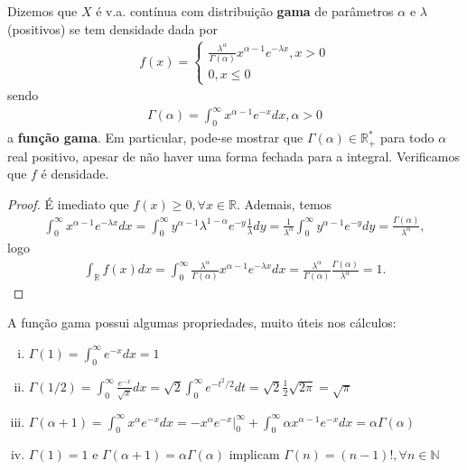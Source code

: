 \documentclass[../Notas.tex]{subfiles}
\begin{document}
\begin{example}
Dizemos que $X$ é v.a. contínua com distribuição \textbf{gama} de parâmetros $\alpha$ e $\lambda$ (positivos) se tem densidade dada por
\begin{align*}
    f(x) = \begin{cases}
    \frac{\lambda^{\alpha}}{\Gamma(\alpha)}x^{\alpha - 1}e^{-\lambda x}, x > 0 \\
    0, x\leq 0
    \end{cases}
\end{align*}
sendo
\begin{align*}
    \Gamma(\alpha) = \int_{0}^{\infty} x^{\alpha - 1}e^{-x} dx, \alpha > 0
\end{align*}
a \textbf{função gama}. Em particular, pode-se mostrar que $\Gamma(\alpha) \in\mathbb{R}^*_+$ para todo $\alpha$ real positivo, apesar de não haver uma forma fechada para a integral. Verificamos que $f$ é densidade.
\begin{proof}
É imediato que $f(x)\geq 0, \forall x\in\mathbb{R}$. Ademais, temos
\begin{align*}
    \int_{0}^{\infty} x^{\alpha - 1}e^{-\lambda x} dx = \int_{0}^{\infty} y^{\alpha - 1}\lambda^{1 - \alpha}e^{-y}\frac{1}{\lambda} dy = \frac{1}{\lambda^{\alpha}}\int_{0}^{\infty} y^{\alpha - 1}e^{-y} dy = \frac{\Gamma(\alpha)}{\lambda^{\alpha}},
\end{align*}
logo
\begin{align*}
    \int_{\mathbb{R}} f(x) dx = \int_{0}^{\infty} \frac{\lambda^{\alpha}}{\Gamma(\alpha)} x^{\alpha - 1}e^{-\lambda x} dx = \frac{\lambda^{\alpha}}{\Gamma(\alpha)}\frac{\Gamma(\alpha)}{\lambda^{\alpha}} = 1.
\end{align*}
\end{proof}
A função gama possui algumas propriedades, muito úteis nos cálculos:
\begin{enumerate}[(i)]
    \item $\displaystyle{ \Gamma(1) = \int_{0}^{\infty} e^{-x} dx = 1 }$
    \item $\displaystyle{ \Gamma(1/2) = \int_{0}^{\infty} \frac{e^{-x}}{\sqrt{x}} dx = \sqrt{2} \int_{0}^{\infty} e^{-t^2/2} dt = \sqrt{2}\frac{1}{2}\sqrt{2\pi} = \sqrt{\pi}}$
    \item $\displaystyle{ \Gamma(\alpha + 1) = \int_{0}^{\infty} x^{\alpha} e^{-x} dx = -x^{\alpha}e^{-x}\Big|_{0}^{\infty} + \int_{0}^{\infty} \alpha x^{\alpha - 1} e^{-x} dx = \alpha\Gamma(\alpha)}$
    \item $\Gamma(1) = 1$ e $\Gamma(\alpha + 1) = \alpha\Gamma(\alpha)$ implicam $\Gamma(n) = (n-1)!, \forall n\in\mathbb{N}$

\end{enumerate}
\end{example}
\end{document}
